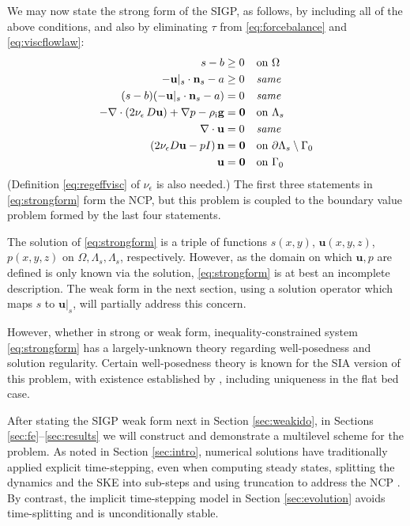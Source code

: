 \documentclass[letterpaper,final,12pt,reqno]{amsart}
\theoremstyle{claim}
\newcommand{\eps}{\epsilon}
\newcommand{\bn}{\mathbf{n}}
\newcommand{\bu}{\mathbf{u}}
\newcommand{\bzero}{\bm{0}}
\newcommand{\rhoi}{\rho_{\text{i}}}
\numberwithin{equation}{section}
\numberwithin{figure}{section}
\numberwithin{table}{section}
\numberwithin{theorem}{section}
\begin{document}
We may now state the strong form of the SIGP, as follows, by including all of the above conditions, and also by eliminating $\tau$ from \eqref{eq:forcebalance} and \eqref{eq:viscflowlaw}:
\begin{align}
s - b &\ge 0 && \text{on $\Omega$} \label{eq:strongform} \\
- \bu|_s \cdot \bn_s - a &\ge 0 && \text{\emph{same}} \notag \\
(s - b) (- \bu|_s \cdot \bn_s - a) &= 0 && \text{\emph{same}} \notag \\
- \nabla \cdot \left(2 \nu_\eps\, D\bu\right) + \nabla p - \rhoi \mathbf{g} &= \bzero && \text{on $\Lambda_s$} \notag \\
\nabla \cdot \bu &= 0 && \text{\emph{same}} \notag \\
\left(2 \nu_\eps D\bu - pI\right) \bn &= \bzero && \text{on $\partial \Lambda_s \setminus \Gamma_0$} \notag \\
\bu &= \bzero && \text{on $\Gamma_0$} \notag
\end{align}
(Definition \eqref{eq:regeffvisc} of $\nu_\eps$ is also needed.)  The first three statements in \eqref{eq:strongform} form the NCP, but this problem is coupled to the boundary value problem formed by the last four statements.

The solution of \eqref{eq:strongform} is a triple of functions $s(x,y)$, $\bu(x,y,z)$, $p(x,y,z)$ on $\Omega,\Lambda_s,\Lambda_s$, respectively.  However, as the domain on which $\bu,p$ are defined is only known via the solution, \eqref{eq:strongform} is at best an incomplete description.  The weak form in the next section, using a solution operator which maps $s$ to $\bu|_s$, will partially address this concern.

However, whether in strong or weak form, inequality-constrained system \eqref{eq:strongform} has a largely-unknown theory regarding well-posedness and solution regularity.  Certain well-posedness theory is known for the SIA version of this problem, with existence established by \cite{JouvetBueler2012}, including uniqueness in the flat bed case.

After stating the SIGP weak form next in Section \ref{sec:weakido}, in Sections \ref{sec:fe}--\ref{sec:results} we will construct and demonstrate a multilevel scheme for the problem.  As noted in Section \ref{sec:intro}, numerical solutions have traditionally applied explicit time-stepping, even when computing steady states, splitting the dynamics and the SKE into sub-steps and using truncation to address the NCP \cite[for example]{Jouvetetal2008,Lengetal2012}.  By contrast, the implicit time-stepping model in Section \ref{sec:evolution} avoids time-splitting and is unconditionally stable.
\end{document}
